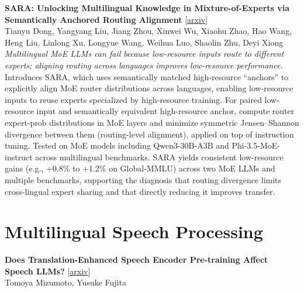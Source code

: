 \documentclass[12pt,letterpaper]{article}
\begin{document}
\medskip

{\small\textbf{SARA: Unlocking Multilingual Knowledge in Mixture-of-Experts via Semantically Anchored Routing Alignment}} {\scriptsize[\href{https://arxiv.org/abs/2606.25821}{arxiv}]}\\
{\scriptsize Tianyu Dong, Yangyang Liu, Jiang Zhou, Xinwei Wu, Xiaohu Zhao, Hao Wang, Heng Liu, Linlong Xu, Longyue Wang, Weihua Luo, Shaolin Zhu, Deyi Xiong}\\

{\small\textit{Multilingual MoE LLMs can fail because low-resource inputs route to different experts; aligning routing across languages improves low-resource performance.}}\\[1pt]
{\footnotesize Introduces SARA, which uses semantically matched high-resource ``anchors'' to explicitly align MoE router distributions across languages, enabling low-resource inputs to reuse experts specialized by high-resource training. For paired low-resource input and semantically equivalent high-resource anchor, compute router expert-prob distributions in MoE layers and minimize symmetric Jensen--Shannon divergence between them (routing-level alignment), applied on top of instruction tuning. Tested on MoE models including Qwen3-30B-A3B and Phi-3.5-MoE-instruct across multilingual benchmarks. SARA yields consistent low-resource gains (e.g., +0.8\% to +1.2\% on Global-MMLU) across two MoE LLMs and multiple benchmarks, supporting the diagnosis that routing divergence limits cross-lingual expert sharing and that directly reducing it improves transfer.}

\medskip


\section*{Multilingual Speech Processing}

{\small\textbf{Does Translation-Enhanced Speech Encoder Pre-training Affect Speech LLMs?}} {\scriptsize[\href{https://arxiv.org/abs/2606.25444}{arxiv}]}\\
{\scriptsize Tomoya Mizumoto, Yusuke Fujita}\\
\end{document}
